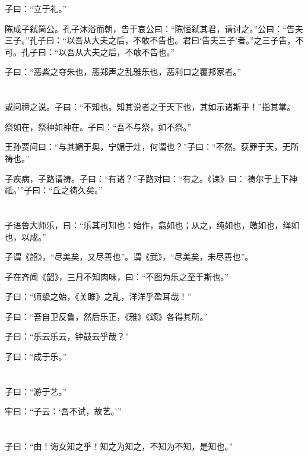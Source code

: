 \documentclass[a5paper]{ctexbook}
\begin{document}
    子曰：“立于礼。”

    陈成子弑简公。孔子沐浴而朝，告于哀公曰：“陈恒弑其君，请讨之。”公曰：“告夫三子。”孔子曰：“以吾从大夫之后，不敢不告也。君曰‘告夫三子’者。”之三子告，不可。孔子曰：“以吾从大夫之后，不敢不告也。”

    子曰：“恶紫之夺朱也，恶郑声之乱雅乐也，恶利口之覆邦家者。”

    \chapter{}

    或问禘之说。子曰：“不知也。知其说者之于天下也，其如示诸斯乎！”指其掌。

    祭如在，祭神如神在。子曰：“吾不与祭，如不祭。”

    王孙贾问曰：“与其媚于奥，宁媚于灶，何谓也？”子曰：“不然。获罪于天，无所祷也。”

    子疾病，子路请祷。子曰：“有诸？”子路对曰：“有之。《诔》曰：‘祷尔于上下神祇。’”子曰：“丘之祷久矣。”

    \chapter{}

    子语鲁大师乐，曰：“乐其可知也：始作，翕如也；从之，纯如也，皦如也，绎如也，以成。”

    子谓《韶》，“尽美矣，又尽善也”。谓《武》，“尽美矣，未尽善也”。

    子在齐闻《韶》，三月不知肉味，曰：“不图为乐之至于斯也。”

    子曰：“师挚之始，《关雎》之乱，洋洋乎盈耳哉！”

    子曰：“吾自卫反鲁，然后乐正，《雅》《颂》各得其所。”

    子曰：“乐云乐云，钟鼓云乎哉？”

    子曰：“成于乐。”

    \chapter{}

    子曰：“游于艺。”

    牢曰：“子云：‘吾不试，故艺。’”

    \chapter{}

    子曰：“由！诲女知之乎！知之为知之，不知为不知，是知也。”
\end{document}
